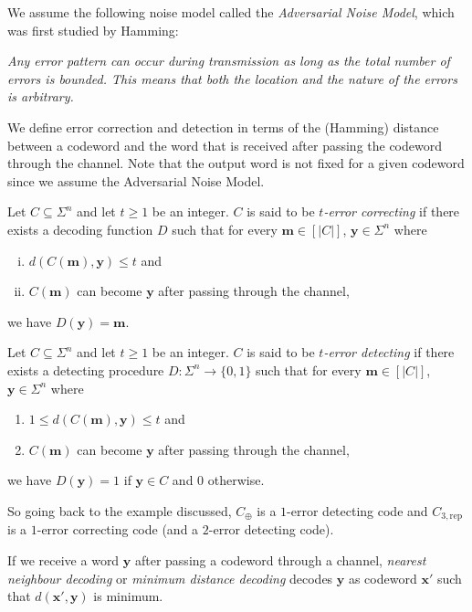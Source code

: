 \vspace{2mm}
We assume the following noise model called the \textit{Adversarial Noise Model}, which was first studied by Hamming:

\textit{Any error pattern can occur during transmission as long as the total number of errors is bounded. This means that both the location and the nature of the errors is arbitrary.}

\vspace{2mm}
We define error correction and detection in terms of the (Hamming) distance between a codeword and the word that is received after passing the codeword through the channel. Note that the output word is not fixed for a given codeword since we assume the Adversarial Noise Model.
\begin{definition}
    Let $C\subseteq\Sigma^n$ and let $t\geq 1$ be an integer. $C$ is said to be \textit{$t$-error correcting} if there exists a decoding function $D$ such that for every $\textbf{m}\in[|C|]$, $\textbf{y}\in\Sigma^n$ where
    \begin{enumerate}[(i)]
        \item $d(C(\textbf{m}),\textbf{y})\leq t$ and
        \item $C(\textbf{m})$ can become $\textbf{y}$ after passing through the channel,
    \end{enumerate}
    we have $D(\textbf{y})=\textbf{m}$.
\end{definition}

\begin{definition}
    Let $C\subseteq\Sigma^n$ and let $t\geq 1$ be an integer. $C$ is said to be \textit{$t$-error detecting} if there exists a detecting procedure $D:\Sigma^n\to\{0,1\}$ such that for every $\textbf{m}\in[|C|]$, $\textbf{y}\in\Sigma^n$ where
    \begin{enumerate}
        \item $1\leq d(C(\textbf{m}),\textbf{y})\leq t$ and
        \item $C(\textbf{m})$ can become $\textbf{y}$ after passing through the channel,
    \end{enumerate}
    we have $D(\textbf{y})=1$ if $\textbf{y}\in C$ and $0$ otherwise.
\end{definition}

So going back to the example discussed, $C_\oplus$ is a $1$-error detecting code and $C_{3,\text{rep}}$ is a $1$-error correcting code (and a $2$-error detecting code).

\begin{definition}
    If we receive a word $\textbf{y}$ after passing a codeword through a channel, \textit{nearest neighbour decoding} or \textit{minimum distance decoding} decodes $\textbf{y}$ as codeword $\textbf{x}'$ such that $d(\textbf{x}',\textbf{y})$ is minimum.
\end{definition}

